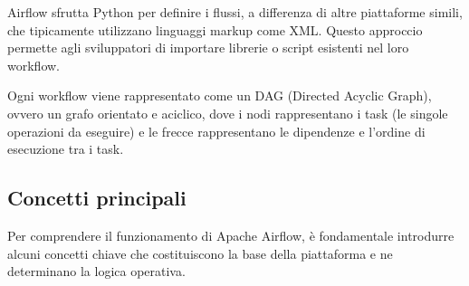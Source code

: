 Airflow sfrutta Python per definire i flussi, a differenza di altre piattaforme simili, che tipicamente utilizzano linguaggi markup come XML. Questo approccio permette agli sviluppatori di importare librerie o script esistenti nel loro workflow.

Ogni workflow viene rappresentato come un DAG (Directed Acyclic Graph), ovvero un grafo orientato e aciclico, dove i nodi rappresentano i task (le singole operazioni da eseguire) e le frecce rappresentano le dipendenze e l’ordine di esecuzione tra i task.


\subsection{Concetti principali}
\label{sec:concettiprincipali}
Per comprendere il funzionamento di Apache Airflow, è fondamentale introdurre alcuni concetti chiave che costituiscono la base della piattaforma e ne determinano la logica operativa.

